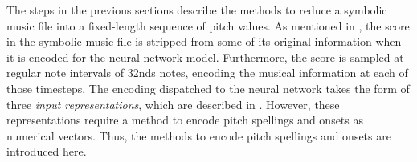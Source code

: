 
The steps in the previous sections describe the methods to
reduce a symbolic music file into a fixed-length sequence of
pitch values. As mentioned in
, the score in the symbolic
music file is stripped from some of its original information
when it is encoded for the neural network model.
Furthermore, the score is sampled at regular note intervals
of \glspl{32nd} notes, encoding the musical information at
each of those timesteps. The encoding dispatched to the
neural network takes the form of three \emph{input
representations}, which are described in
. However, these
representations require a method to encode pitch spellings
and onsets as numerical vectors. Thus, the methods to encode
pitch spellings and onsets are introduced here.
